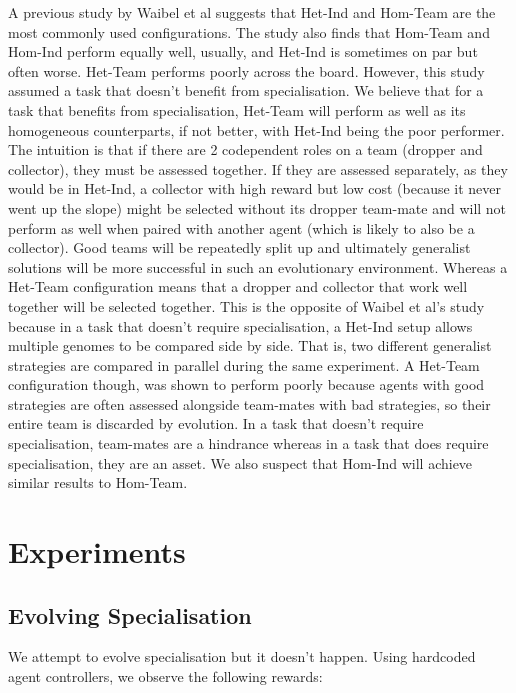 \documentclass[12pt]{article}  %
\begin{document}
A previous study by Waibel et al suggests that Het-Ind and Hom-Team are the most commonly used configurations.
The study also finds that Hom-Team and Hom-Ind perform equally well, usually, and Het-Ind is sometimes on par but often worse. 
Het-Team performs poorly across the board.
However, this study assumed a task that doesn’t benefit from specialisation. 
We believe that for a task that benefits from specialisation, Het-Team will perform as well as its homogeneous counterparts, if not better, with Het-Ind being the poor performer.
The intuition is that if there are 2 codependent roles on a team (dropper and collector), they must be assessed together. 
If they are assessed separately, as they would be in Het-Ind, a collector with high reward but low cost (because it never went up the slope) might be selected without its dropper team-mate and will not perform as well when paired with another agent (which is likely to also be a collector).
Good teams will be repeatedly split up and ultimately generalist solutions will be more successful in such an evolutionary environment.
Whereas a Het-Team configuration means that a dropper and collector that work well together will be selected together.
This is the opposite of Waibel et al's study because in a task that doesn't require specialisation, a Het-Ind setup allows multiple genomes to be compared side by side.
That is, two different generalist strategies are compared in parallel during the same experiment.
A Het-Team configuration though, was shown to perform poorly because agents with good strategies are often assessed alongside team-mates with bad strategies, so their entire team is discarded by evolution.
In a task that doesn't require specialisation, team-mates are a hindrance whereas in a task that does require specialisation, they are an asset.
We also suspect that Hom-Ind will achieve similar results to Hom-Team.

\section{Experiments}

\subsection{Evolving Specialisation}
We attempt to evolve specialisation but it doesn't happen.
Using hardcoded agent controllers, we observe the following rewards:\\
\end{document}
